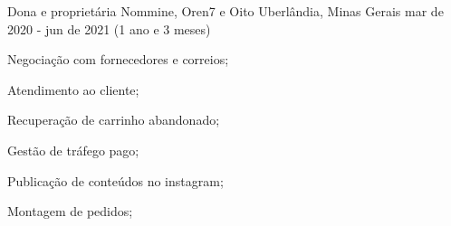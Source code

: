 \cventry
    {Dona e proprietária}
    {Nommine, Oren7 e Oito}
    {Uberlândia, Minas Gerais}
    {mar de 2020 - jun de 2021 (1 ano e 3 meses)}
    {
        \begin{cvitems}
            \item {
                Negociação com fornecedores e correios;
            }
            \item {
                Atendimento ao cliente;
            }
            \item {
                Recuperação de carrinho abandonado;
            }
            \item {
                Gestão de tráfego pago; 
            }
            \item {
                Publicação de conteúdos no instagram; 
            }
            \item {
                Montagem de pedidos; 
            }
        \end{cvitems}
    }
    {}